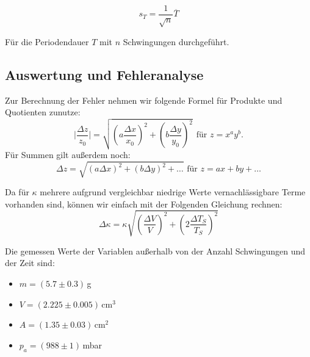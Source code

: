 \documentclass[11pt,a4paper]{article}
\begin{document}
\begin{equation}
s_T=\frac{1}{\sqrt{n}}\overline{T}\label{equt}
\end{equation}

F\"ur die Periodendauer $T$ mit $n$ Schwingungen durchgef\"uhrt.

\subsection{Auswertung und Fehleranalyse}

%

Zur Berechnung der Fehler nehmen wir folgende Formel f\"ur Produkte  und Quotienten zunutze:
\begin{equation}
\vert\frac{\Delta z}{z_0}\vert = \sqrt{\left({a\frac{\Delta x}{x_0}}\right)^2+\left({b\frac{\Delta y}{y_0}}\right)^2} \ \ \textrm{f\"ur } z=x^a y^b. 
\end{equation}
F\"ur Summen gilt au\ss erdem noch:
\begin{equation}
\Delta z = \sqrt{(a\Delta x)^2 + (b \Delta y)^2+\ldots} \textrm{  f\"ur } z = ax+by+\ldots
\end{equation}


Da f\"ur $\kappa$ mehrere aufgrund vergleichbar niedrige Werte vernachl\"assigbare Terme vorhanden sind, k\"onnen wir einfach mit der Folgenden Gleichung rechnen:
\begin{equation}\Delta \kappa  = \kappa \sqrt{\left({\frac{\Delta V}{V}}\right)^2 + \left({2\frac{\Delta T_S}{T_S}}\right)^2} \end{equation}

Die gemessen Werte der Variablen au\ss erhalb von der Anzahl Schwingungen und der Zeit sind:
\begin{itemize}
\item $m=(5.7\pm0.3)\,$g
\item $V=(2.225\pm0.005)\,$cm$^3$
\item $A=(1.35\pm0.03)\,$cm$^2$
\item $p_a=(988\pm1)$\,mbar
\end{itemize}
\end{document}
